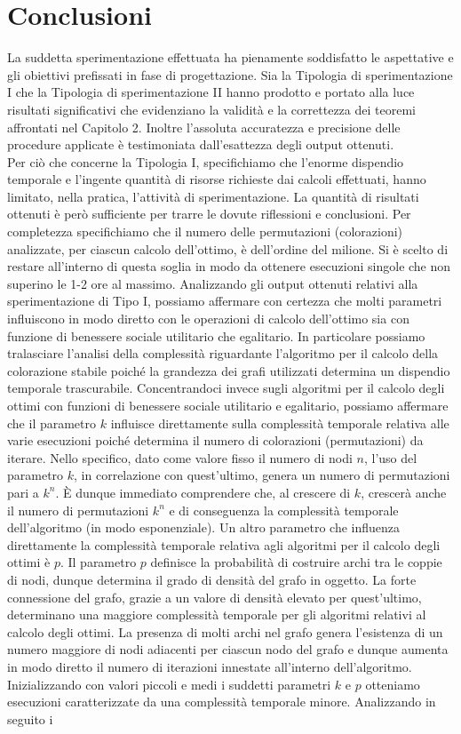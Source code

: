 \section{Conclusioni}
\justify
La suddetta sperimentazione effettuata ha pienamente soddisfatto le aspettative e gli obiettivi prefissati in fase di progettazione. Sia la Tipologia di sperimentazione I che la Tipologia di sperimentazione II hanno prodotto e portato alla luce risultati significativi che evidenziano la validità e la correttezza dei teoremi affrontati nel Capitolo 2. Inoltre l'assoluta accuratezza e precisione delle procedure applicate è testimoniata dall'esattezza degli output ottenuti.\\
Per ciò che concerne la Tipologia I, specifichiamo che l'enorme dispendio temporale e l'ingente quantità di risorse richieste dai calcoli effettuati, hanno limitato, nella pratica, l'attività di sperimentazione. La quantità di risultati ottenuti è però sufficiente per trarre le dovute riflessioni e conclusioni. Per completezza specifichiamo che il numero delle permutazioni (colorazioni) analizzate, per ciascun calcolo dell'ottimo, è dell'ordine del milione. Si è scelto di restare all'interno di questa soglia in modo da ottenere esecuzioni singole che non superino le 1-2 ore al massimo. Analizzando gli output ottenuti relativi alla sperimentazione di Tipo I, possiamo affermare con certezza che molti parametri influiscono in modo diretto con le operazioni di calcolo dell'ottimo sia con funzione di benessere sociale utilitario che egalitario. In particolare possiamo tralasciare l'analisi della complessità riguardante l'algoritmo per il calcolo della colorazione stabile poiché la grandezza dei grafi utilizzati determina un dispendio temporale trascurabile. Concentrandoci invece sugli algoritmi per il calcolo degli ottimi con funzioni di benessere sociale utilitario e egalitario, possiamo affermare che il parametro $k$ influisce direttamente sulla complessità temporale relativa alle varie esecuzioni poiché determina il numero di colorazioni (permutazioni) da iterare. Nello specifico, dato come valore fisso il numero di nodi $n$, l'uso del parametro $k$, in correlazione con quest'ultimo, genera un numero di permutazioni pari a \(k^n\). È dunque immediato comprendere che, al crescere di $k$, crescerà anche il numero di permutazioni \(k^n\) e di conseguenza la complessità temporale dell'algoritmo (in modo esponenziale). Un altro parametro che influenza direttamente la complessità temporale relativa agli algoritmi per il calcolo degli ottimi è $p$. Il parametro $p$ definisce la probabilità di costruire archi tra le coppie di nodi, dunque determina il grado di densità del grafo in oggetto. La forte connessione del grafo, grazie a un valore di densità elevato per quest'ultimo, determinano una maggiore complessità temporale per gli algoritmi relativi al calcolo degli ottimi. La presenza di molti archi nel grafo genera l'esistenza di un numero maggiore di nodi adiacenti per ciascun nodo del grafo e dunque aumenta in modo diretto il numero di iterazioni innestate all'interno dell'algoritmo. Inizializzando con valori piccoli e medi i suddetti parametri $k$ e $p$ otteniamo esecuzioni caratterizzate da una complessità temporale minore. Analizzando in seguito i 